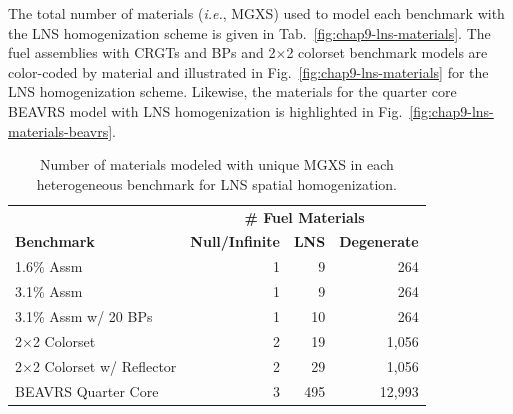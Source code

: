 The total number of materials (\textit{i.e.}, \ac{MGXS}) used to model each benchmark with the \ac{LNS} homogenization scheme is given in Tab.~\ref{fig:chap9-lns-materials}. The fuel assemblies with \acp{CRGT} and \acp{BP} and 2$\times$2 colorset benchmark models are color-coded by material and illustrated in Fig.~\ref{fig:chap9-lns-materials} for the \ac{LNS} homogenization scheme. Likewise, the materials for the quarter core \ac{BEAVRS} model with \ac{LNS} homogenization is highlighted in Fig.~\ref{fig:chap9-lns-materials-beavrs}. 

\begin{table}[h!]
  \centering
  \caption[Number of materials for LNS spatial homogenization]{Number of materials modeled with unique \ac{MGXS} in each heterogeneous benchmark for \ac{LNS} spatial homogenization.}
  \small
  \label{table:chap9-num-materials-lns}
  \vspace{6pt}
  \begin{tabular}{l r r r}
  \toprule
  \rowcolor{lightgray}
  & \multicolumn{3}{c}{\cellcolor{lightgray} \bf \# Fuel Materials} \\
  \multirow{-2}{*}{\cellcolor{lightgray} \bf Benchmark} &
  \multicolumn{1}{c}{\cellcolor{lightgray} \bf Null/Infinite} &
  \multicolumn{1}{c}{\cellcolor{lightgray} \bf \ac{LNS}} &
  \multicolumn{1}{c}{\cellcolor{lightgray} \bf Degenerate} \\
  \midrule
1.6\% Assm & 1 & 9 & 264 \\
3.1\% Assm & 1 & 9 & 264 \\
3.1\% Assm w/ 20 BPs & 1 & 10 & 264  \\
2$\times$2 Colorset & 2 & 19 & 1,056 \\
2$\times$2 Colorset w/ Reflector & 2 & 29 & 1,056 \\
\ac{BEAVRS} Quarter Core & 3 & 495 & 12,993 \\ %
  \bottomrule
\end{tabular}
\end{table}

